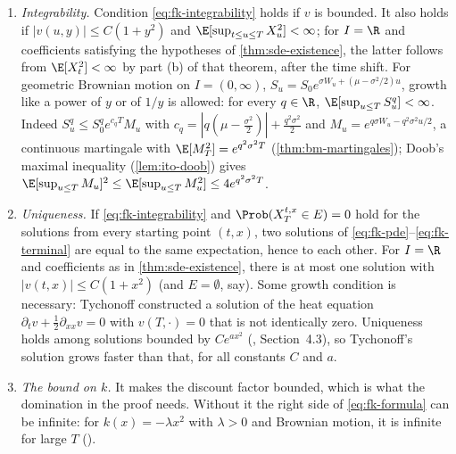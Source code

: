 \begin{remark}\label{rem:fk-hypotheses}
\leavevmode
\begin{enumerate}[label=(\alph*),leftmargin=*]
  \item \emph{Integrability.} Condition \eqref{eq:fk-integrability} holds if $v$ is bounded. It
    also holds if $|v(u,y)|\le C(1+y^2)$ and $\E[\sup_{t\le u\le T}X_u^2]<\infty$; for $I=\R$ and
    coefficients satisfying the hypotheses of \cref{thm:sde-existence}, the latter follows from
    $\E[X_t^2]<\infty$ by part (b) of that theorem, after the time shift. For geometric Brownian
    motion on $I=(0,\infty)$, $S_u=S_0e^{\sigma W_u+(\mu-\sigma^2/2)u}$, growth like a power of
    $y$ or of $1/y$ is allowed: for every $q\in\R$, $\E[\sup_{u\le T}S_u^q]<\infty$. Indeed
    $S_u^q\le S_0^qe^{c_qT}M_u$ with $c_q=|q(\mu-\frac{\sigma^2}2)|+\frac{q^2\sigma^2}{2}$ and
    $M_u=e^{q\sigma W_u-q^2\sigma^2u/2}$, a continuous martingale with $\E[M_T^2]=e^{q^2\sigma^2T}$
    (\cref{thm:bm-martingales}); Doob's maximal inequality (\cref{lem:ito-doob}) gives $\E[\sup_{u\le T}M_u]^2\le\E[\sup_{u\le T}M_u^2]\le4e^{q^2\sigma^2T}$.
  \item \emph{Uniqueness.} If \eqref{eq:fk-integrability} and $\Prob(X^{t,x}_T\in E)=0$ hold for the
    solutions from every starting point $(t,x)$, two solutions of \eqref{eq:fk-pde}--\eqref{eq:fk-terminal} are equal to
    the same expectation, hence to each other. For $I=\R$ and coefficients as in
    \cref{thm:sde-existence}, there is at most one solution with $|v(t,x)|\le C(1+x^2)$ (and
    $E=\emptyset$, say). Some growth
    condition is necessary: Tychonoff constructed a solution of the heat equation
    $\partial_tv+\frac12\partial_{xx}v=0$ with $v(T,\cdot)=0$ that is not identically zero.
    Uniqueness holds among solutions bounded by $Ce^{ax^2}$ (\textcite{karatzas-shreve},
    Section~4.3), so Tychonoff's solution grows faster than that, for all constants $C$ and $a$.
  \item \emph{The bound on $k$.} It makes the discount factor bounded, which is what the
    domination in the proof needs. Without it the right side of \eqref{eq:fk-formula} can be
    infinite: for $k(x)=-\lambda x^2$ with $\lambda>0$ and Brownian motion, it is infinite for
    large $T$ ().
\end{enumerate}
\end{remark}

